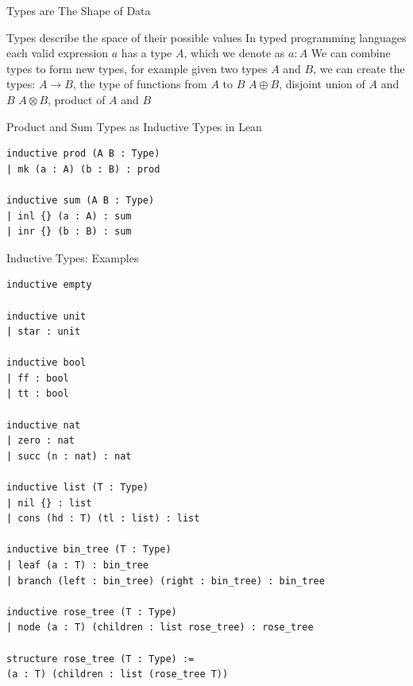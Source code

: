 \documentclass[pdf]{beamer}
\begin{document}
\begin{frame}{Types are The Shape of Data}
  \begin{outline}
    \1 Types describe the space of their possible values
    \1 In typed programming languages each valid expression $a$ has a type $A$, which we denote as $a : A$
    \1 We can combine types to form new types, for example given two types $A$ and $B$, we can create the types:
    \2 $A \to B$, the type of functions from $A$ to $B$
    \2 $A \oplus B$, disjoint union of $A$ and $B$
    \2 $A \otimes B$, product of $A$ and $B$
  \end{outline}
\end{frame}

\begin{frame}[fragile]{Product and Sum Types as Inductive Types in Lean}
  \begin{verbatim}
inductive prod (A B : Type)
| mk (a : A) (b : B) : prod

inductive sum (A B : Type)
| inl {} (a : A) : sum
| inr {} (b : B) : sum
  \end{verbatim}
\end{frame}

\begin{frame}[fragile]{Inductive Types: Examples}
  \begin{verbatim}
inductive empty

inductive unit
| star : unit

inductive bool
| ff : bool
| tt : bool

inductive nat
| zero : nat
| succ (n : nat) : nat

inductive list (T : Type)
| nil {} : list
| cons (hd : T) (tl : list) : list

inductive bin_tree (T : Type)
| leaf (a : T) : bin_tree
| branch (left : bin_tree) (right : bin_tree) : bin_tree

inductive rose_tree (T : Type)
| node (a : T) (children : list rose_tree) : rose_tree

structure rose_tree (T : Type) :=
(a : T) (children : list (rose_tree T))
  \end{verbatim}
\end{frame}
\end{document}
